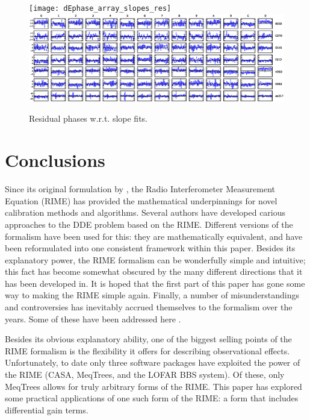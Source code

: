 \documentclass[]{aa}
\begin{document}

\begin{figure}
\sidecaption
\parbox[b]{12cm}{
\texttt{[image: dEphase\_array\_slopes\_res]}
\includegraphics[width=12cm]{o2006_dEphase_array_slopes_res}
}
\caption{\label{fig:dEphase-slope-res}Residual phases w.r.t. slope fits.}
\end{figure}


\section{Conclusions}

Since its original formulation by \citet{ME1}, the Radio Interferometer Measurement Equation (RIME) has 
provided the mathematical underpinnings for novel calibration methods and algorithms. Several authors have developed carious approaches to the DDE problem based on the RIME. Different versions of the formalism have been used for this: they are mathematically equivalent, and have been reformulated into one consistent framework within this paper. Besides its explanatory power, the RIME formalism can be wonderfully simple and intuitive; this 
fact has become somewhat obscured by the many different directions that it has been developed in. It is hoped that the first part of this paper has gone some way to making the RIME simple again. Finally, a number of misunderstandings and controversies has inevitably accrued themselves to the formalism over the years. Some of these have been addressed here .

Besides its obvious explanatory ability, one of the biggest selling points of the RIME formalism is the flexibility it offers for describing observational effects. Unfortunately, to date only three software packages have exploited the power of the RIME (CASA, MeqTrees, and the LOFAR BBS system). Of these, only MeqTrees allows for truly arbitrary forms of the RIME. This paper has explored some practical applications of one such form of the RIME: a form that includes differential gain terms.
\end{document}
